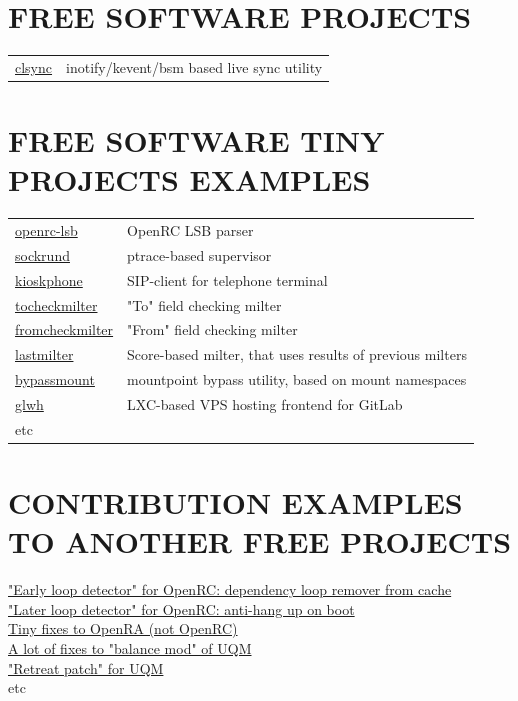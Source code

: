\begin{resume}
\section{FREE SOFTWARE PROJECTS}
\vspace{0.1in} 
\begin{tabular}{ll}
\href{https://github.com/xaionaro/clsync}{clsync} & {inotify/kevent/bsm based live sync utility}
\end{tabular}

\section{FREE SOFTWARE TINY PROJECTS EXAMPLES}
\vspace{0.1in} 
\begin{tabular}{ll}
\href{https://github.com/xaionaro/openrc-lsb}{openrc-lsb} 		& {OpenRC LSB parser}\\
\href{https://github.com/xaionaro/sockrund}{sockrund} 			& {ptrace-based supervisor}\\
\href{svn://svn.mephi.ru/kioskphone}{kioskphone} 			& {SIP-client for telephone terminal}\\
\href{https://github.com/mephi-ut/tocheckmilter}{tocheckmilter} 	& "To" field checking milter\\
\href{https://github.com/mephi-ut/fromcheckmilter}{fromcheckmilter} 	& "From" field checking milter\\
\href{https://github.com/mephi-ut/lastmilter}{lastmilter} 		& Score-based milter, that uses results of previous milters\\
\href{https://github.com/mephi-ut/bypassmount}{bypassmount} 		& mountpoint bypass utility, based on mount namespaces\\
\href{https://gitlab.ut.mephi.ru/ut/glwh}{glwh} 			& LXC-based VPS hosting frontend for GitLab\\
etc
\end{tabular}

\section{CONTRIBUTION EXAMPLES TO ANOTHER FREE PROJECTS}
\vspace{0.1in} 
\href{https://github.com/OpenRC/openrc/pull/12}{"Early loop detector" for OpenRC: dependency loop remover from cache}\\
\href{https://github.com/OpenRC/openrc/pull/13}{"Later loop detector" for OpenRC: anti-hang up on boot}\\
\href{https://github.com/OpenRA/OpenRA/commits?author=xaionaro}{Tiny fixes to OpenRA (not OpenRC)}\\
\href{https://github.com/SirDifferential/Shiver-Balance-Mod/commits?author=xaionaro}{A lot of fixes to "balance mod" of UQM}\\
\href{http://forum.uqm.stack.nl/index.php?topic=4817.0}{"Retreat patch" for UQM}\\
etc

\end{resume}
